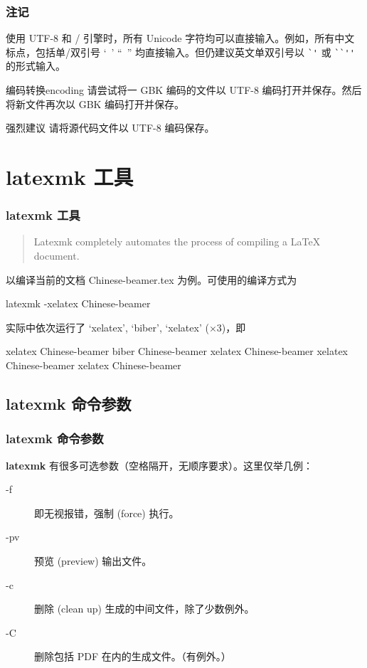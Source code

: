 \documentclass[final,aspectratio=32]{ctexbeamer}
\begin{document}
\begin{frame}[fragile]
\frametitle{注记}
使用 UTF-8 和 / 引擎时，所有 Unicode 字符均可以直接输入。例如，所有中文标点，包括单/双引号 ‘\, ’ “\, ” 均直接输入。但仍建议英文单双引号以 \verb|`'| 或 \verb|``''| 的形式输入。

\begin{Ex}{编码转换}{encoding}
请尝试将一 GBK 编码的文件以 UTF-8 编码打开并保存。然后将新文件再次以 GBK 编码打开并保存。
\end{Ex}
\begin{block}{强烈建议}
请将源代码文件以 UTF-8 编码保存。
\end{block}
\end{frame}


\section{latexmk 工具}\label{ap:latexmk}
\begin{frame}[fragile]
\frametitle{latexmk 工具}
\begin{quote}
Latexmk completely automates the process of compiling a LaTeX document.
\end{quote}
以编译当前的文档 Chinese-beamer.tex 为例。可使用的编译方式为
\begin{bashlst}
latexmk -xelatex Chinese-beamer
\end{bashlst}
实际中依次运行了 `xelatex', `biber', `xelatex' ($\times 3$)，即
\begin{bashlst}[numbers=left]
xelatex Chinese-beamer
biber Chinese-beamer
xelatex Chinese-beamer
xelatex Chinese-beamer
xelatex Chinese-beamer
\end{bashlst}
\end{frame}

\subsection{latexmk 命令参数}
\begin{frame}
\frametitle[命令参数]{latexmk 命令参数}
\textbf{latexmk} 有很多可选参数（空格隔开，无顺序要求）。这里仅举几例：
\begin{description}
\item[-f] 即无视报错，强制 (force) 执行。
\item[-pv] 预览 (preview) 输出文件。
\item[-c] 删除 (clean up) 生成的中间文件，除了少数例外。
\item[-C] 删除包括 PDF 在内的生成文件。（有例外。）
\end{description}
\end{frame}
\end{document}
